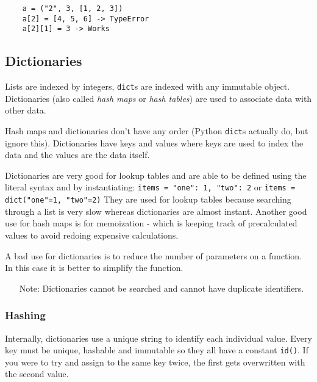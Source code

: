 \begin{verbatim}
    a = ("2", 3, [1, 2, 3])
    a[2] = [4, 5, 6] -> TypeError
    a[2][1] = 3 -> Works
\end{verbatim}

\subsection{Dictionaries}\label{sub:dictionaries}

Lists are indexed by integers, \texttt{dict}s are indexed with any immutable object.
Dictionaries (also called \emph{hash maps} or \emph{hash tables}) are used to associate data with other data.

Hash maps and dictionaries don't have any order (Python \texttt{dict}s actually do, but ignore this).
Dictionaries have keys and values where keys are used to index the data and the values are the data itself.

Dictionaries are very good for lookup tables and are able to be defined using the literal syntax and by instantiating: \texttt{items = {"one": 1, "two": 2}} or \texttt{items = dict("one"=1, "two"=2)}
They are used for lookup tables because searching through a list is very slow whereas dictionaries are almost instant.
Another good use for hash maps is for memoization - which is keeping track of precalculated values to avoid redoing expensive calculations.

A bad use for dictionaries is to reduce the number of parameters on a function.
In this case it is better to simplify the function.

\begin{note}
	\begin{itemize}
		\item[Note:] Dictionaries cannot be searched and cannot have duplicate identifiers.
	\end{itemize}
\end{note}

\subsubsection{Hashing}\label{ssub:hashing}

Internally, dictionaries use a unique string to identify each individual value.
Every key must be unique, hashable and immutable so they all have a constant \texttt{id()}.
If you were to try and assign to the same key twice, the first gets overwritten with the second value.

